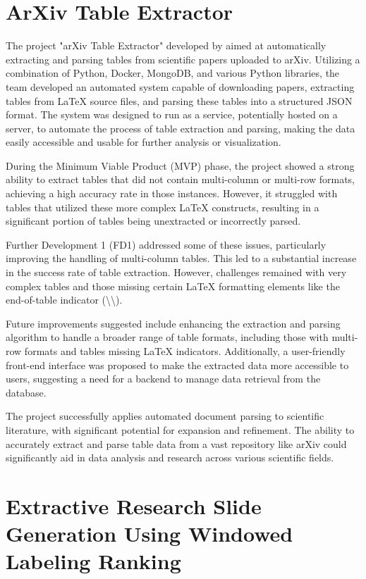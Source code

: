 \section{ArXiv Table Extractor}

The project "arXiv Table Extractor" developed by \citet{Ramsay:2021:BachelorThesis} aimed at automatically extracting and parsing tables from scientific papers uploaded to arXiv. Utilizing a combination of Python, Docker, MongoDB, and various Python libraries, the team developed an automated system capable of downloading papers, extracting tables from \LaTeX{} source files, and parsing these tables into a structured JSON format. The system was designed to run as a service, potentially hosted on a server, to automate the process of table extraction and parsing, making the data easily accessible and usable for further analysis or visualization.

During the Minimum Viable Product (MVP) phase, the project showed a strong ability to extract tables that did not contain multi-column or multi-row formats, achieving a high accuracy rate in those instances. However, it struggled with tables that utilized these more complex \LaTeX{} constructs, resulting in a significant portion of tables being unextracted or incorrectly parsed.

Further Development 1 (FD1) addressed some of these issues, particularly improving the handling of multi-column tables. This led to a substantial increase in the success rate of table extraction. However, challenges remained with very complex tables and those missing certain \LaTeX{} formatting elements like the end-of-table indicator (\textbackslash\textbackslash).

Future improvements suggested include enhancing the extraction and parsing algorithm to handle a broader range of table formats, including those with multi-row formats and tables missing \LaTeX{} indicators. Additionally, a user-friendly front-end interface was proposed to make the extracted data more accessible to users, suggesting a need for a backend to manage data retrieval from the database.

The project successfully applies automated document parsing to scientific literature, with significant potential for expansion and refinement. The ability to accurately extract and parse table data from a vast repository like arXiv could significantly aid in data analysis and research across various scientific fields.


\section{Extractive Research Slide Generation Using Windowed Labeling Ranking}


